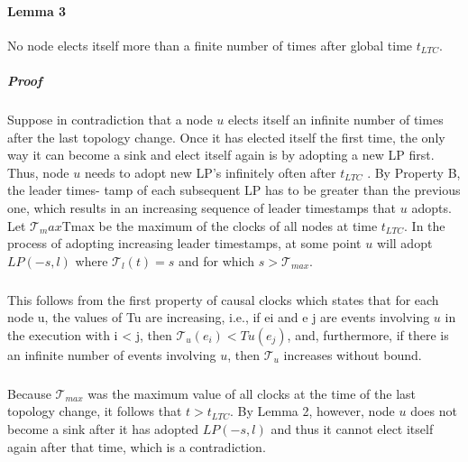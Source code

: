 \paragraph{Lemma 3}No node elects itself more than a finite number of times after global time $t_{LTC}$.
\subparagraph{Proof}Suppose in contradiction that a node $u$ elects itself an infinite number of times after the last topology change. Once it has elected itself the first time, the only way it can become a sink and elect itself again is by adopting a new LP first. Thus, node $u$ needs to adopt new LP's infinitely often after $t_{LTC}$ . By Property B, the leader times- tamp of each subsequent LP has to be greater than the previous one, which results in an increasing sequence of leader timestamps that $u$ adopts. Let $\mathcal{T}_max$Tmax be the maximum of the clocks of all nodes at time $t_{LTC}$. In the process of adopting increasing leader timestamps, at some point $u$ will adopt $LP(-s, l)$ where $\mathcal{T} _l (t) = s$ and for which $s > \mathcal{T} _{max}$.
\subparagraph{}This follows from the first property of causal clocks which states that for each node u, the values of Tu are increasing, i.e., if ei and e j are events involving $u$ in the execution with i < j, then $\mathcal{T} _u (e_i ) < Tu (e_j )$, and, furthermore, if there is an infinite number of events involving $u$, then $\mathcal{T} _u$ increases without bound. 
\subparagraph{}Because $\mathcal{T} _{max}$ was the maximum value of all clocks at the time of the last topology change, it follows that $t > t_{LTC}$. By Lemma 2, however, node $u$ does not become a sink after it has adopted $LP(-s, l)$ and thus it cannot elect itself again after that time, which is a contradiction.
